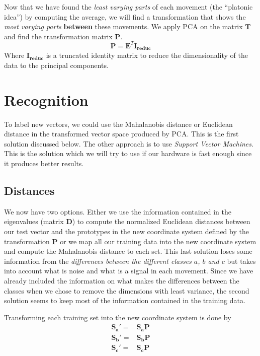 \documentclass[11pt,twocolumn]{amsart} %
\newcommand{\ma}[1]{\boldsymbol{#1}}
\begin{document}
Now that we have found the \emph{least varying parts} of each movement (the ``platonic idea'') by computing the average, we will find a transformation that shows the \emph{most varying parts} \textbf{between} these movements. We apply PCA on the matrix $\ma{T}$ and find the transformation matrix $\ma{P}$.
\[
  \ma{P} = \ma{E}^T \ma{I_{reduc}}
\]
Where $\ma{I_{reduc}}$ is a truncated identity matrix to reduce the dimensionality of the data to the principal components.

\section{Recognition}

To label new vectors, we could use the Mahalanobis distance or Euclidean distance in the transformed vector space produced by PCA. This is the first solution discussed below. The other approach is to use \emph{Support Vector Machines}. This is the solution which we will try to use if our hardware is fast enough since it produces better results.

\subsection{Distances}

We now have two options. Either we use the information contained in the eigenvalues (matrix $\ma{D}$) to compute the normalized Euclidean distances between our test vector and the prototypes in the new coordinate system defined by the transformation $\ma{P}$ or we map all our training data into the new coordinate system and compute the Mahalanobis distance to each set. This last solution loses some information from the \emph{differences between the different classes $a$, $b$ and $c$} but takes into account what is noise and what is a signal in each movement. Since we have already included the information on what makes the differences between the classes when we chose to remove the dimensions with least variance, the second solution seems to keep most of the information contained in the training data.

Transforming each training set into the new coordinate system is done by
\begin{align*}
  \ma{S_{a}'} = & \ma{S_a}\ma{P} \\
  \ma{S_{b}'} = & \ma{S_b}\ma{P} \\
  \ma{S_{c}'} = & \ma{S_c}\ma{P} \\
\end{align*}
\end{document}
